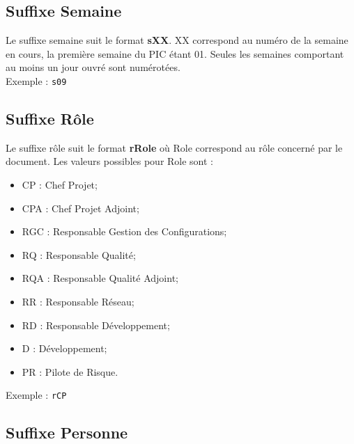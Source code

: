 \subsection{Suffixe Semaine}
\label{suffixe_semaine}

Le suffixe semaine suit le format \textbf{sXX}. XX correspond au numéro de la semaine en cours, la première semaine du PIC étant 01. Seules les semaines comportant au moins un jour ouvré sont numérotées.\\

Exemple : \verb+s09+

\subsection{Suffixe Rôle}
\label{suffixe_role}

Le suffixe rôle suit le format \textbf{rRole} où Role correspond au rôle concerné par le document. Les valeurs possibles pour Role sont : 
\begin{itemize}
\item CP : Chef Projet;
\item CPA : Chef Projet Adjoint;
\item RGC : Responsable Gestion des Configurations;
\item RQ : Responsable Qualité;
\item RQA : Responsable Qualité Adjoint;
\item RR : Responsable Réseau;
\item RD : Responsable Développement;
\item D : Développement;
\item PR : Pilote de Risque.\\
\end{itemize}

Exemple : \verb+rCP+

\subsection{Suffixe Personne}
\label{suffixe_personne}

